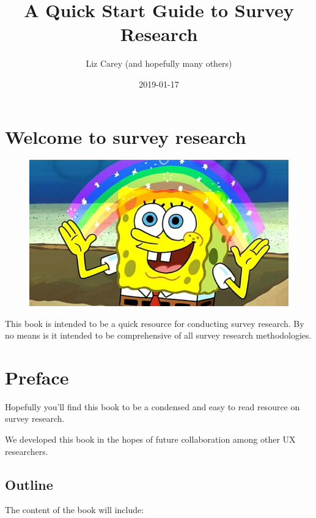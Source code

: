 \documentclass[]{book}
\title{A Quick Start Guide to Survey Research}
\author{Liz Carey (and hopefully many others)}
\date{2019-01-17}
\begin{document}
\maketitle

{
\hypersetup{linkcolor=black}
\setcounter{tocdepth}{1}
\tableofcontents
}
\chapter*{Welcome to survey research}\label{welcome-to-survey-research}

\begin{figure}
\centering
\includegraphics{figs/sponge_bob.png}
\caption{}
\end{figure}

This book is intended to be a quick resource for conducting survey
research. By no means is it intended to be comprehensive of all survey
research methodologies.

\chapter*{Preface}\label{preface}

Hopefully you'll find this book to be a condensed and easy to read
resource on survey research.

We developed this book in the hopes of future collaboration among other
UX researchers.

\section*{Outline}\label{outline}

The content of the book will include:
\end{document}
